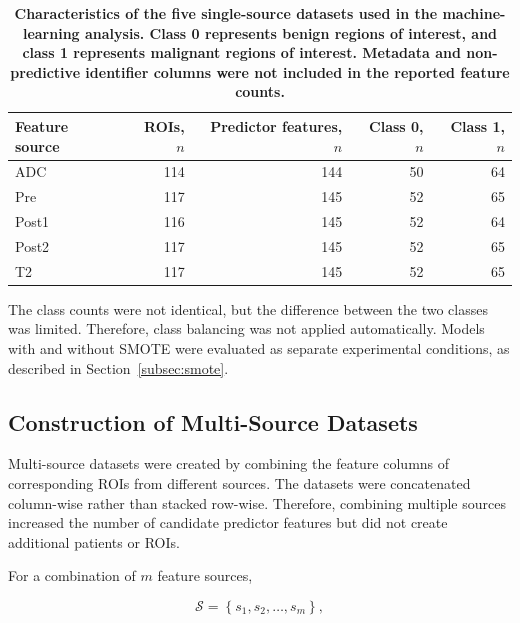 \documentclass[12pt,twocolumn]{article}
\begin{document}
\begin{table}[htbp]
\centering
\caption{\textbf{Characteristics of the five single-source datasets
used in the machine-learning analysis. Class 0 represents benign
regions of interest, and class 1 represents malignant regions of
interest. Metadata and non-predictive identifier columns were not
included in the reported feature counts.}}
\label{tab:single_source_dataset_characteristics}
\small
\begin{tabular}{lrrrr}
\toprule
\textbf{Feature source} &
\textbf{ROIs, \(n\)} &
\textbf{Predictor features, \(n\)} &
\textbf{Class 0, \(n\)} &
\textbf{Class 1, \(n\)} \\
\midrule
ADC   & 114 & 144 & 50 & 64 \\
Pre   & 117 & 145 & 52 & 65 \\
Post1 & 116 & 145 & 52 & 64 \\
Post2 & 117 & 145 & 52 & 65 \\
T2    & 117 & 145 & 52 & 65 \\
\bottomrule
\end{tabular}
\end{table}

The class counts were not identical, but the difference between the
two classes was limited. Therefore, class balancing was not applied
automatically. Models with and without SMOTE were evaluated as
separate experimental conditions, as described in
Section~\ref{subsec:smote}.







\subsection{Construction of Multi-Source Datasets}
\label{subsec:multisource_construction}

Multi-source datasets were created by combining the feature columns
of corresponding ROIs from different sources. The datasets were
concatenated column-wise rather than stacked row-wise. Therefore,
combining multiple sources increased the number of candidate
predictor features but did not create additional patients or ROIs.

For a combination of \(m\) feature sources,

\begin{equation}
\mathcal{S}
=
\left\{
s_1,s_2,\ldots,s_m
\right\},
\end{equation}
\end{document}
